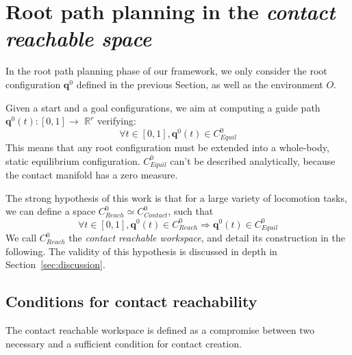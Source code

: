 \section{Root path planning in the \textit{contact reachable space}}
\label{rbprm}

In the root path planning phase of our framework, we only consider the root configuration $\mathbf{q}^0$ defined in the previous Section,
as well as the environment $O$.

Given a start and a goal configurations, we aim at computing a guide path $\mathbf{q}^0(t) : [0,1] \longrightarrow$ $\mathbb{R}^r$ verifying:
\begin{equation*} \label{eq:path}
\forall t \in [0,1], \mathbf{q}^0(t)  \in C_{Equil}^0
\end{equation*}
This means that any root configuration must be extended into a whole-body, static equilibrium configuration.
$C_{Equil}^0$  can't be described analytically, because the contact manifold has a zero measure.

The strong hypothesis of this work is that for a large variety of locomotion tasks, we can define a space  $C_{Reach}^0 \simeq C_{Contact}^0$, such that 
\begin{equation} \label{eq:creach}
\forall t \in [0,1], \mathbf{q}^0(t) \in C_{Reach}^0 \Rightarrow \mathbf{q}^0(t)  \in C_{Equil}^0
\end{equation}
We call  $C_{Reach}^0$ the \textit{contact reachable workspace}, and detail its construction in the following.
The validity of this hypothesis is discussed in depth in Section~\ref{sec:discussion}.
 
\subsection{Conditions for contact reachability}
The contact reachable workspace is defined as a compromise between two necessary and a sufficient condition for contact creation.

